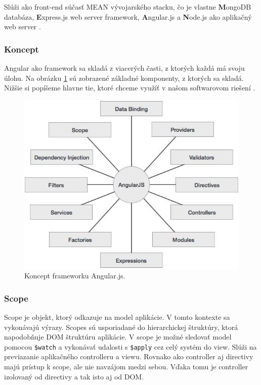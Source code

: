 Slúži ako front-end súčasť MEAN vývojarského stacku, čo je vlastne \textbf{M}ongoDB databáza, \textbf{E}xpress.js web server framework, \textbf{A}ngular.js  a \textbf{N}ode.js ako aplikačný web server \cite{angular-wiki}\cite{angular-docs}.

\subsubsection{Koncept}
Angular ako framework sa skladá z viacerých časti, z ktorých každá má svoju úlohu. Na obrázku \ref{img-angular-concept} sú zobrazené základné komponenty, z ktorých sa skladá. Nižšie si popíšeme hlavne tie, ktoré chceme využíť v našom softwarovom riešení \cite{angular-concept}.

\begin{figure}[H]
  \centering
  \includegraphics[scale=0.5]{img/angular/angularjs_concepts.jpg}
  \caption{Koncept frameworku Angular.js.}
  \label{img-angular-concept}
\end{figure}


\subsubsection{Scope}
Scope je objekt, ktorý odkazuje na model aplikácie. V tomto kontexte sa vykonávajú výrazy. Scopes sú usporiadané do hierarchickej štruktúry, ktorá napodobňuje DOM štruktúru aplikácie. V scope je možné sledovať model pomocou \verb|$watch| a vykonávať udalosti s \verb|$apply| cez celý systém do view. Slúži na previazanie aplikačného controlleru a viewu. Rovnako ako controller aj directivy majú prístup k scope, ale nie navzájom medzi sebou. Vďaka tomu je controller izolovaný od directivy a tak isto aj od DOM.

